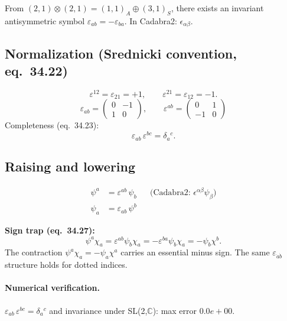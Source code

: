 \documentclass[12pt]{article}
\theoremstyle{remark}
\newcommand{\verified}[1]{\textcolor{verifygreen}{\checkmark\; #1}}
\begin{document}
From $(2,1)\otimes(2,1) = (1,1)_A \oplus (3,1)_S$, there exists
an invariant antisymmetric symbol $\varepsilon_{ab} = -\varepsilon_{ba}$.
In Cadabra2: $\epsilon_{\alpha \beta}$.

\subsection{Normalization (Srednicki convention, eq.~34.22)}
\begin{equation}
  \varepsilon^{12} = \varepsilon_{21} = +1,\qquad
  \varepsilon^{21} = \varepsilon_{12} = -1.
\end{equation}
\[
  \varepsilon_{ab} = \begin{pmatrix}0 & -1 \\ 1 & 0\end{pmatrix},\qquad
  \varepsilon^{ab} = \begin{pmatrix}0 & 1 \\ -1 & 0\end{pmatrix}
\]
Completeness (eq.~34.23):
\begin{equation}
  \varepsilon_{ab}\,\varepsilon^{bc} = \delta_a{}^c.
\end{equation}

\subsection{Raising and lowering}
\begin{align}
  \psi^a &= \varepsilon^{ab}\,\psi_b
  &&\text{(Cadabra2: } \epsilon^{\alpha \beta} \psi_{\beta}\text{)} \\
  \psi_a &= \varepsilon_{ab}\,\psi^b
\end{align}

\noindent\textbf{Sign trap (eq.~34.27):}
\begin{equation}
  \psi^a\chi_a = \varepsilon^{ab}\psi_b\chi_a
  = -\varepsilon^{ba}\psi_b\chi_a = -\psi_b\chi^b.
\end{equation}
The contraction $\psi^a\chi_a = -\psi_a\chi^a$ carries an essential minus sign.
The same $\varepsilon_{\dot{a}\dot{b}}$ structure holds for dotted indices.

\paragraph{Numerical verification.}
\verified{$\varepsilon_{ab}\,\varepsilon^{bc} = \delta_a{}^c$ and invariance under SL(2,$\mathbb{C}$): max error $0.0e+00$.}

\end{document}

